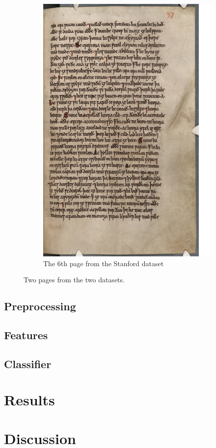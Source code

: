 \documentclass[11pt,a4paper]{article}
\begin{document}
\begin{figure}[hbt]
\begin{subfigure}[b]{0.4\textwidth}
	\includegraphics[width=\textwidth]{figures/stanford6}
	\caption{The 6th page from the Stanford dataset}
\end{subfigure}
\caption{Two pages from the two datasets. }
\label{fig:dataset}
\end{figure}


\subsection{Preprocessing}
\subsection{Features}
\subsection{Classifier}
\section{Results}
\section{Discussion}


\end{document}
